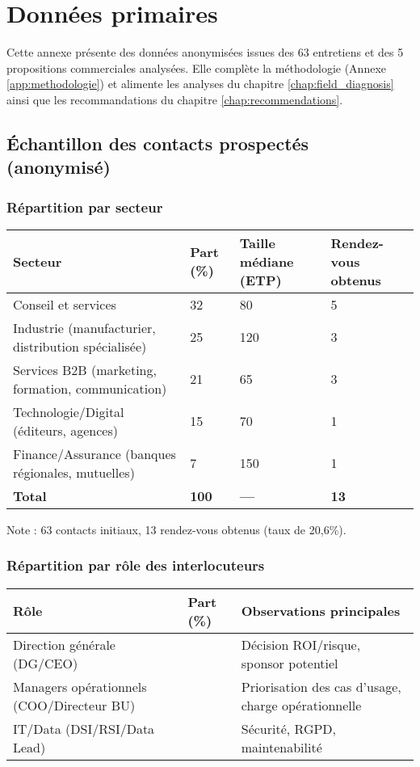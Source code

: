 \chapter{Données primaires}
\label{app:data}

Cette annexe présente des données anonymisées issues des 63 entretiens et des 5 propositions commerciales analysées. Elle complète la méthodologie (Annexe \ref{app:methodologie}) et alimente les analyses du chapitre \ref{chap:field_diagnosis} ainsi que les recommandations du chapitre \ref{chap:recommendations}.

\section{Échantillon des contacts prospectés (anonymisé)}
\subsection{Répartition par secteur}
\begin{longtable}{@{}p{6cm}p{3cm}p{3cm}p{3cm}@{}}
\toprule
\textbf{Secteur} & \textbf{Part (\%)} & \textbf{Taille médiane (ETP)} & \textbf{Rendez-vous obtenus} \\
\midrule
Conseil et services & 32 & 80 & 5 \\
Industrie (manufacturier, distribution spécialisée) & 25 & 120 & 3 \\
Services B2B (marketing, formation, communication) & 21 & 65 & 3 \\
Technologie/Digital (éditeurs, agences) & 15 & 70 & 1 \\
Finance/Assurance (banques régionales, mutuelles) & 7 & 150 & 1 \\
\midrule
\textbf{Total} & \textbf{100} & \textbf{—} & \textbf{13} \\
\bottomrule
\end{longtable}
Note : 63 contacts initiaux, 13 rendez-vous obtenus (taux de 20,6\%).

\subsection{Répartition par rôle des interlocuteurs}
\begin{longtable}{@{}>{\raggedright\arraybackslash}p{6cm}>{\raggedright\arraybackslash}p{2.5cm}>{\raggedright\arraybackslash}p{5cm}@{}}
\toprule
\textbf{Rôle} & \textbf{Part (\%)} & \textbf{Observations principales} \\
\midrule
Direction générale (DG/CEO) & 38 & Décision ROI/risque, sponsor potentiel \\
Managers opérationnels (COO/Directeur BU) & 34 & Priorisation des cas d'usage, charge opérationnelle \\
IT/Data (DSI/RSI/Data Lead) & 28 & Sécurité, RGPD, maintenabilité \\
\bottomrule
\end{longtable}

